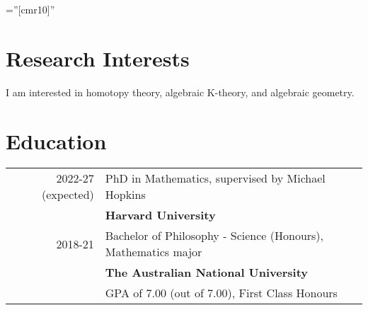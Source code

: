\documentclass[a4paper,12pt]{article} %
\begin{document}
\pagestyle{empty} %

\font\fb=''[cmr10]'' %


\par{\par} %
\par{\par}


\section{Research Interests}

I am interested in homotopy theory, algebraic K-theory, and algebraic geometry.


\section{Education}

\begin{tabular}{rl}	
2022-27 (expected) & PhD in Mathematics, supervised by Michael Hopkins\\
& \normalsize\textbf{Harvard University}\\

2018-21 &  Bachelor of Philosophy - Science (Honours), Mathematics major\\& \normalsize\textbf{The Australian National University}\\
&GPA of 7.00 (out of 7.00), First Class Honours\\

\end{tabular}
\end{document}

